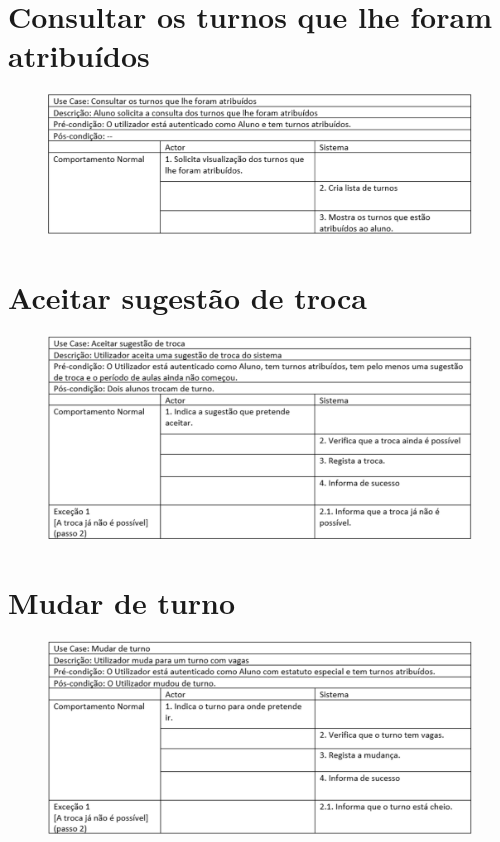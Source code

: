 \documentclass[12pt,a4paper]{report}
\begin{document}
\begin{appendices}
\section{Consultar os turnos que lhe foram atribuídos}
\begin{figure}[H]
	\centering 
	\includegraphics[width=\textwidth]{modelacao/especificacao_use_case/ConsultarTurnosAtribuidos.png}  
\end{figure}

\section{Aceitar sugestão de troca}
\begin{figure}[H]
	\centering 
	\includegraphics[width=\textwidth]{modelacao/especificacao_use_case/AceitarSugestaoTroca.png}  
\end{figure}

\section{Mudar de turno}
\begin{figure}[H]
	\centering 
	\includegraphics[width=\textwidth]{modelacao/especificacao_use_case/MudarTurno.png}  
\end{figure}


\end{appendices}
\end{document}
